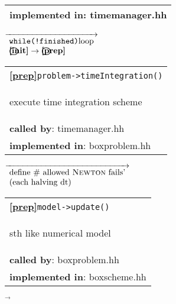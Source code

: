 \begin{landscape}
{\begin{tabular}{|l|}
    \textbf{implemented in}: {timemanager.hh}\\  
    \hline
  \end{tabular} 
{\scriptsize
    $\overrightarrow{ %
      \begin{array}{l} %
	\textnormal{\texttt{while(!finished)}loop}\\
	\textbf{\textbf{\textcircled{\ref{init}}}} \rightarrow \textbf{\textcircled{\ref{prep}} }
      \end{array}
    }$}
  \begin{tabular}{|l|}
    \hline
    \textbf{\textcircled{\ref{prep}}}\verb+problem->timeIntegration()+ \\
    \begin{scriptsize}execute time integration scheme \end{scriptsize}\\
    \textbf{called by}: timemanager.hh\\
    \textbf{implemented in}: boxproblem.hh\\  
\hline
  \end{tabular}    
\nextline
    {\scriptsize$\overrightarrow{
      \begin{array}{l}
	\textnormal{define \# allowed \textsc{Newton} fails'} \\
	\textnormal{(each halving dt)}
      \end{array}
    }$}
      \begin{tabular}{|l|}
    \hline
    \textbf{\textcircled{\ref{prep}}}\verb+model->update()+ \\
    \begin{scriptsize}sth like numerical model\end{scriptsize}\\
    \textbf{called by}: boxproblem.hh\\
    \textbf{implemented in}: boxscheme.hh\\  
	\hline
  \end{tabular}
    {\scriptsize$\overrightarrow{ }$}
}
\end{landscape}
